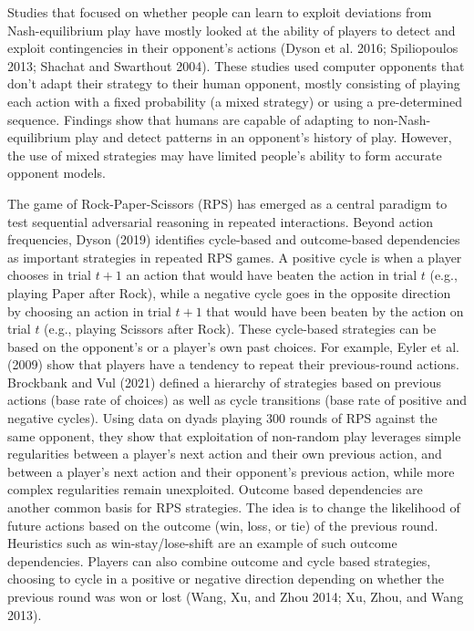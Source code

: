 \documentclass[smallextended]{svjour3}       %
\begin{document}
Studies that focused on whether people can learn to exploit deviations
from Nash-equilibrium play have mostly looked at the ability of players
to detect and exploit contingencies in their opponent's actions (Dyson
et al. 2016; Spiliopoulos 2013; Shachat and Swarthout 2004). These
studies used computer opponents that don't adapt their strategy to their
human opponent, mostly consisting of playing each action with a fixed
probability (a mixed strategy) or using a pre-determined sequence.
Findings show that humans are capable of adapting to
non-Nash-equilibrium play and detect patterns in an opponent's history
of play. However, the use of mixed strategies may have limited people's
ability to form accurate opponent models.

The game of Rock-Paper-Scissors (RPS) has emerged as a central paradigm
to test sequential adversarial reasoning in repeated interactions.
Beyond action frequencies, Dyson (2019) identifies cycle-based and
outcome-based dependencies as important strategies in repeated RPS
games. A positive cycle is when a player chooses in trial \(t+1\) an
action that would have beaten the action in trial \(t\) (e.g., playing
Paper after Rock), while a negative cycle goes in the opposite direction
by choosing an action in trial \(t+1\) that would have been beaten by
the action on trial \(t\) (e.g., playing Scissors after Rock). These
cycle-based strategies can be based on the opponent's or a player's own
past choices. For example, Eyler et al. (2009) show that players have a
tendency to repeat their previous-round actions. Brockbank and Vul
(2021) defined a hierarchy of strategies based on previous actions (base
rate of choices) as well as cycle transitions (base rate of positive and
negative cycles). Using data on dyads playing 300 rounds of RPS against
the same opponent, they show that exploitation of non-random play
leverages simple regularities between a player's next action and their
own previous action, and between a player's next action and their
opponent's previous action, while more complex regularities remain
unexploited. Outcome based dependencies are another common basis for RPS
strategies. The idea is to change the likelihood of future actions based
on the outcome (win, loss, or tie) of the previous round. Heuristics
such as win-stay/lose-shift are an example of such outcome dependencies.
Players can also combine outcome and cycle based strategies, choosing to
cycle in a positive or negative direction depending on whether the
previous round was won or lost (Wang, Xu, and Zhou 2014; Xu, Zhou, and
Wang 2013).
\end{document}

